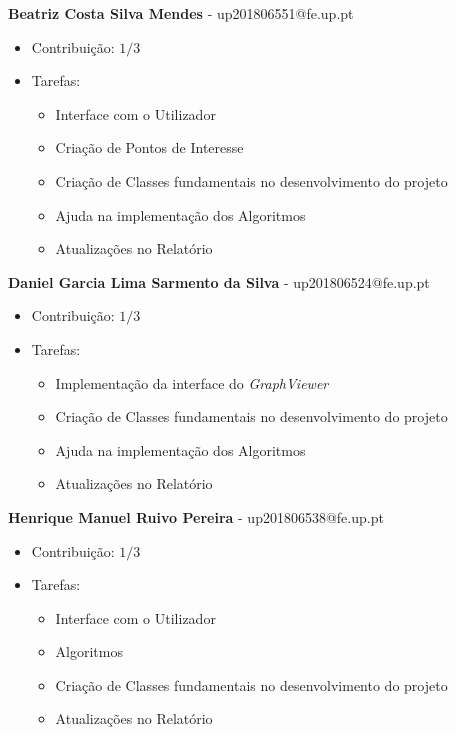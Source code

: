 \documentclass[article, a4paper, 12pt, oneside]{memoir}
\begin{document}
\textbf{Beatriz Costa Silva Mendes} - up201806551@fe.up.pt

\begin{itemize}
\item Contribuição: $1/3$
\item Tarefas:
	\begin{itemize}
	\item Interface com o Utilizador
	\item Criação de Pontos de Interesse
	\item Criação de Classes fundamentais no desenvolvimento do projeto
	\item Ajuda na implementação dos Algoritmos
	\item Atualizações no Relatório	
	\end{itemize}
\end{itemize}


\textbf{Daniel Garcia Lima Sarmento da Silva} - up201806524@fe.up.pt

\begin{itemize}
\item Contribuição: $1/3$
\item Tarefas:
	\begin{itemize}
	\item Implementação da interface do \textit{GraphViewer}
	\item Criação de Classes fundamentais no desenvolvimento do projeto
	\item Ajuda na implementação dos Algoritmos
	\item Atualizações no Relatório
	\end{itemize}
\end{itemize}


\textbf{Henrique Manuel Ruivo Pereira} - up201806538@fe.up.pt

\begin{itemize}
\item Contribuição: $1/3$
\item Tarefas:
	\begin{itemize}
	\item Interface com o Utilizador
	\item Algoritmos
	\item Criação de Classes fundamentais no desenvolvimento do projeto
	\item Atualizações no Relatório
	\end{itemize}
\end{itemize}


\newpage
\end{document}
